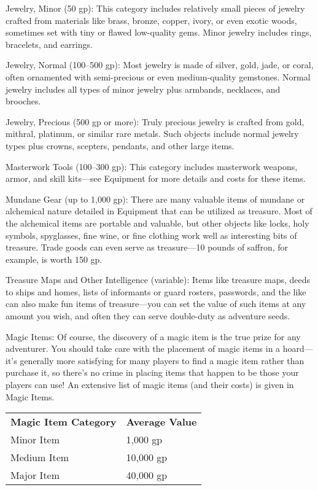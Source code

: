 Jewelry, Minor (50 gp): This category includes relatively small pieces of jewelry crafted from materials like brass, bronze, copper, ivory, or even exotic woods, sometimes set with tiny or flawed low-quality gems. Minor jewelry includes rings, bracelets, and earrings.
				
Jewelry, Normal (100--500 gp): Most jewelry is made of silver, gold, jade, or coral, often ornamented with semi-precious or even medium-quality gemstones. Normal jewelry includes all types of minor jewelry plus armbands, necklaces, and brooches.
				
Jewelry, Precious (500 gp or more): Truly precious jewelry is crafted from gold, mithral, platinum, or similar rare metals. Such objects include normal jewelry types plus crowns, scepters, pendants, and other large items.
				
Masterwork Tools (100--300 gp): This category includes masterwork weapons, armor, and skill kits---see Equipment for more details and costs for these items.
				
Mundane Gear (up to 1,000 gp): There are many valuable items of mundane or alchemical nature detailed in Equipment that can be utilized as treasure. Most of the alchemical items are portable and valuable, but other objects like locks, holy symbols, spyglasses, fine wine, or fine clothing work well as interesting bits of treasure. Trade goods can even serve as treasure---10 pounds of saffron, for example, is worth 150 gp.
				
Treasure Maps and Other Intelligence (variable): Items like treasure maps, deeds to ships and homes, lists of informants or guard rosters, passwords, and the like can also make fun items of treasure---you can set the value of such items at any amount you wish, and often they can serve double-duty as adventure seeds.
				
Magic Items: Of course, the discovery of a magic item is the true prize for any adventurer. You should take care with the placement of magic items in a hoard---it's generally more satisfying for many players to find a magic item rather than purchase it, so there's no crime in placing items that happen to be those your players can use! An extensive list of magic items (and their costs) is given in Magic Items.
				
\begin{tabular}{ll}
\textbf{Magic Item Category} & \textbf{Average Value}\\
Minor Item & 1,000 gp\\
Medium Item & 10,000 gp\\
Major Item & 40,000 gp \\
\end{tabular}

